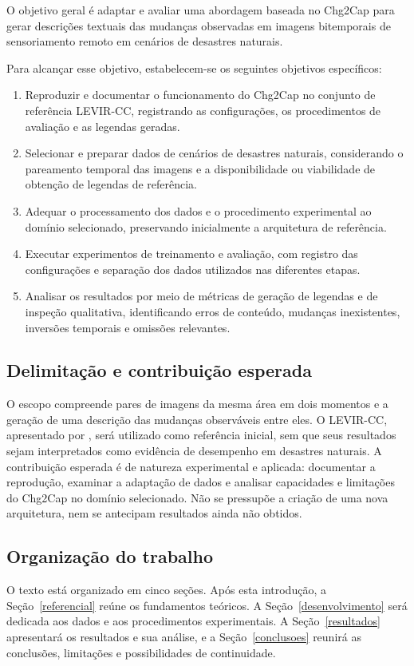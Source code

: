 O objetivo geral é adaptar e avaliar uma abordagem baseada no Chg2Cap para gerar descrições textuais das mudanças observadas em imagens bitemporais de sensoriamento remoto em cenários de desastres naturais.

Para alcançar esse objetivo, estabelecem-se os seguintes objetivos específicos:

\begin{enumerate}
    \item Reproduzir e documentar o funcionamento do Chg2Cap no conjunto de referência LEVIR-CC, registrando as configurações, os procedimentos de avaliação e as legendas geradas.
    \item Selecionar e preparar dados de cenários de desastres naturais, considerando o pareamento temporal das imagens e a disponibilidade ou viabilidade de obtenção de legendas de referência.
    \item Adequar o processamento dos dados e o procedimento experimental ao domínio selecionado, preservando inicialmente a arquitetura de referência.
    \item Executar experimentos de treinamento e avaliação, com registro das configurações e separação dos dados utilizados nas diferentes etapas.
    \item Analisar os resultados por meio de métricas de geração de legendas e de inspeção qualitativa, identificando erros de conteúdo, mudanças inexistentes, inversões temporais e omissões relevantes.
\end{enumerate}

\subsection{Delimitação e contribuição esperada}

O escopo compreende pares de imagens da mesma área em dois momentos e a geração de uma descrição das mudanças observáveis entre eles. O LEVIR-CC, apresentado por \citet{liu2022}, será utilizado como referência inicial, sem que seus resultados sejam interpretados como evidência de desempenho em desastres naturais. A contribuição esperada é de natureza experimental e aplicada: documentar a reprodução, examinar a adaptação de dados e analisar capacidades e limitações do Chg2Cap no domínio selecionado. Não se pressupõe a criação de uma nova arquitetura, nem se antecipam resultados ainda não obtidos.

\subsection{Organização do trabalho}

O texto está organizado em cinco seções. Após esta introdução, a Seção~\ref{referencial} reúne os fundamentos teóricos. A Seção~\ref{desenvolvimento} será dedicada aos dados e aos procedimentos experimentais. A Seção~\ref{resultados} apresentará os resultados e sua análise, e a Seção~\ref{conclusoes} reunirá as conclusões, limitações e possibilidades de continuidade.
